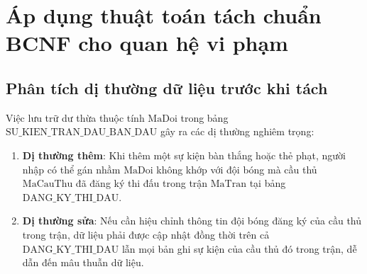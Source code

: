 \section{Áp dụng thuật toán tách chuẩn BCNF cho quan hệ vi phạm}

\subsection{Phân tích dị thường dữ liệu trước khi tách}
Việc lưu trữ dư thừa thuộc tính $\text{MaDoi}$ trong bảng $\text{SU\_KIEN\_TRAN\_DAU\_BAN\_DAU}$ gây ra các dị thường nghiêm trọng:
\begin{enumerate}
    \item \textbf{Dị thường thêm}: Khi thêm một sự kiện bàn thắng hoặc thẻ phạt, người nhập có thể gán nhầm $\text{MaDoi}$ không khớp với đội bóng mà cầu thủ $\text{MaCauThu}$ đã đăng ký thi đấu trong trận $\text{MaTran}$ tại bảng $\text{DANG\_KY\_THI\_DAU}$.
    \item \textbf{Dị thường sửa}: Nếu cần hiệu chỉnh thông tin đội bóng đăng ký của cầu thủ trong trận, dữ liệu phải được cập nhật đồng thời trên cả $\text{DANG\_KY\_THI\_DAU}$ lẫn mọi bản ghi sự kiện của cầu thủ đó trong trận, dễ dẫn đến mâu thuẫn dữ liệu.
\end{enumerate}

